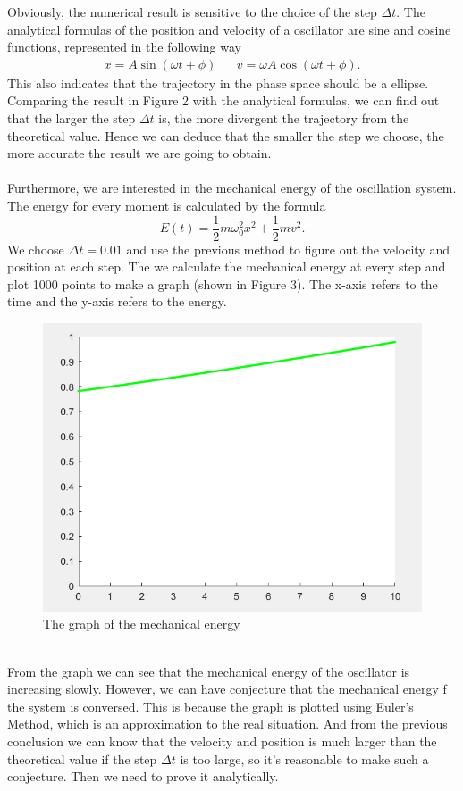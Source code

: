 \documentclass[12pt]{report}
\begin{document}
\newpage
Obviously, the numerical result is sensitive to the choice of the step $\Delta t$.  The analytical formulas of the position and velocity of a oscillator are sine and cosine functions, represented in the following way
\begin{align}
x=A\sin(\omega t+\phi) && v=\omega A\cos(\omega t+\phi).
\end{align}
This also indicates that the trajectory in the phase space should be a ellipse. Comparing the result in Figure 2 with the analytical formulas, we can find out that the larger the step $\Delta t$ is, the more divergent the trajectory from the theoretical value. Hence we can deduce that the smaller the step we choose, the more accurate the result we are going to obtain.\\~\\
Furthermore, we are interested in the mechanical energy of the oscillation system. The energy for every moment is calculated by the formula
\begin{equation}
    E(t)=\frac{1}{2}m\omega_{0}^2x^2+\frac{1}{2}mv^2.
\end{equation}
We choose $\Delta t=0.01$ and use the previous method to figure out the velocity and position at each step. The we calculate the mechanical energy at every step and plot 1000 points to make a graph (shown in Figure 3). The x-axis refers to the time and the y-axis refers to the energy.
\begin{figure}[htbp]
\centering
\includegraphics[width=0.8\linewidth]{3-1-5.png}
\caption{The graph of the mechanical energy}
\end{figure}\\
From the graph we can see that the mechanical energy of the oscillator is increasing slowly. However, we can have conjecture that the mechanical energy f the system is conversed. This is because the graph is plotted using Euler's Method, which is an approximation to the real situation. And from the previous conclusion we can know that the velocity and position is much larger than the theoretical value if the step $\Delta t$ is too large, so it's reasonable to make such a conjecture. Then we need to prove it analytically.\\~\\
\end{document}
